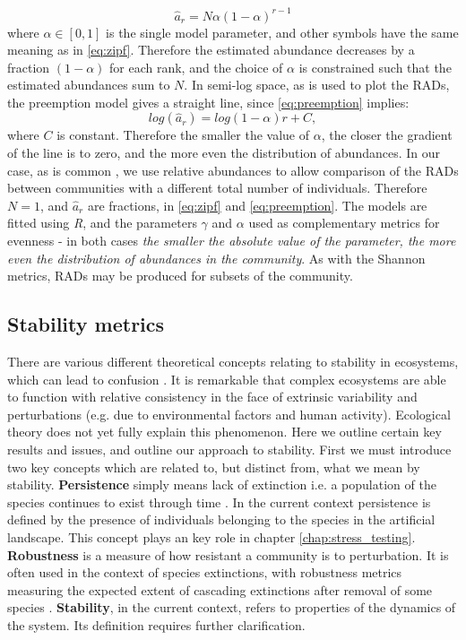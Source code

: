 \begin{equation}
\hat{a}_r = N\alpha(1-\alpha)^{r-1}
\label{eq:preemption}
\end{equation}
%  
where $\alpha \in [0,1]$ is the single model parameter, and other symbols have the same meaning as in \eqref{eq:zipf}. Therefore the estimated abundance decreases by a fraction $(1-\alpha)$ for each rank, and the choice of $\alpha$ is constrained such that the estimated abundances sum to $N$. In semi-log space, as is used to plot the RADs, the preemption model gives a straight line, since \eqref{eq:preemption} implies:
\begin{equation}
log\left(\hat{a}_r\right) = log\left(1-\alpha\right)r + C,
\label{eq:preemption_line}
\end{equation}
%  
where $C$ is constant. Therefore the smaller the value of $\alpha$, the closer the gradient of the line is to zero, and the more even the distribution of abundances. In our case, as is common \cite{oksanen2007vegan}, we use relative abundances to allow comparison of the RADs between communities with a different total number of individuals. Therefore $N=1$, and $\hat{a}_r$ are fractions, in \eqref{eq:zipf} and \eqref{eq:preemption}. The models are fitted using \emph{R}, and the parameters $\gamma$ and $\alpha$ used as complementary metrics for evenness - in both cases \emph{the smaller the absolute value of the parameter, the more even the distribution of abundances in the community}. As with the Shannon metrics, RADs may be produced for subsets of the community.   


\subsection{Stability metrics}
\label{sec:def_stability_metrics}

There are various different theoretical concepts relating to stability in ecosystems, which can lead to confusion \cite{arnoldi2015,mumby2014ecological}. It is remarkable that complex ecosystems are able to function with relative consistency in the face of extrinsic variability and perturbations (e.g. due to environmental factors and human activity). Ecological theory does not yet fully explain this phenomenon. Here we outline certain key results and issues, and outline our approach to stability. First we must introduce two key concepts which are related to, but distinct from, what we mean by stability. \textbf{Persistence} simply means lack of extinction i.e. a population of the species continues to exist through time \cite{dytham1995effect}. In the current context persistence is defined by the presence of individuals belonging to the species in the artificial landscape. This concept plays an key role in chapter \ref{chap:stress_testing}. \textbf{Robustness} is a measure of how resistant a community is to perturbation. It is often used in the context of species extinctions, with robustness metrics measuring the expected extent of cascading extinctions after removal of some species \cite{evans2013robustness}. \textbf{Stability}, in the current context, refers to properties of the dynamics of the system. Its definition requires further clarification.    


